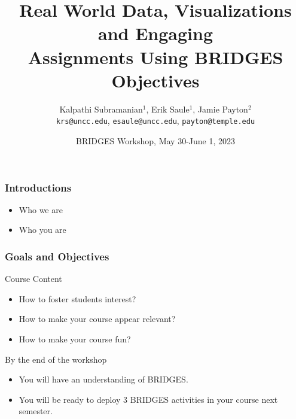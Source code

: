 \documentclass[aspectratio=169]{beamer}
\title[Objectives]{Real World Data, Visualizations and Engaging \\Assignments Using BRIDGES\vspace*{0.05in}\\Objectives}
\subtitle{}
\author{Kalpathi Subramanian$^1$, Erik Saule$^1$, Jamie Payton$^2$\\\texttt{krs@uncc.edu}, \texttt{esaule@uncc.edu}, \texttt{payton@temple.edu} }
\institute{$^1$The University of North Carolina at Charlotte\\$^2$Temple University}
\date{BRIDGES Workshop, May 30-June 1, 2023}
\begin{document}
\begin{frame}
\titlepage

\end{frame}


\begin{frame}
  \frametitle{Introductions}

  \begin{itemize}
  \item Who we are
  \item Who you are
  \end{itemize}
\end{frame}

\begin{frame}
  \frametitle{Goals and Objectives}


    
    \begin{block}{Course Content}
      \begin{itemize}
      \item How to foster students interest?
      \item How to make your course appear relevant?
      \item How to make your course fun?
      \end{itemize}
    \end{block}


  \begin{block}{By the end of the workshop}
    \begin{itemize}
    \item You will have an understanding of BRIDGES.
    \item You will be ready to deploy 3 BRIDGES activities in your course next semester.
    \end{itemize}
  \end{block}

  
\end{frame}
\end{document}
